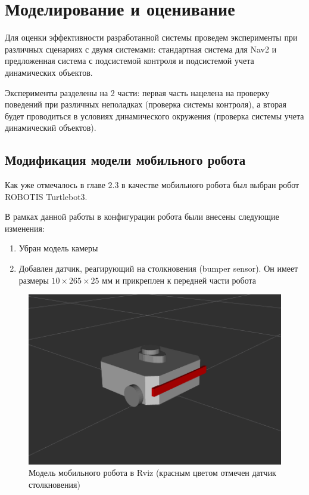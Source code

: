 \chapter{Моделирование и оценивание}
\label{ch:chap4}

Для оценки эффективности разработанной системы проведем эксперименты при различных сценариях с двумя системами: стандартная система для Nav2 и предложенная система с подсистемой контроля и подсистемой учета динамических объектов.

Эксперименты разделены на 2 части: первая часть нацелена на проверку поведений при различных неполадках (проверка системы контроля), а вторая будет проводиться в условиях динамического окружения (проверка системы учета динамический объектов).

\section{Модификация модели мобильного робота}

Как уже отмечалось в главе 2.3 в качестве мобильного робота был выбран робот ROBOTIS Turtlebot3.

В рамках данной работы в конфигурации робота были внесены следующие изменения:
\begin{enumerate}
    \item Убран модель камеры
    \item Добавлен датчик, реагирующий на столкновения (bumper sensor). Он имеет размеры $10\times265\times25$ мм и прикреплен к передней части робота
\end{enumerate}

\begin{figure}[H]
    \centering
    \includegraphics{images/chap_4/tb3-rviz.png}
    \caption{Модель мобильного робота в Rviz (красным цветом отмечен датчик столкновения)}
    \label{fig:tb3-rviz}
\end{figure}

